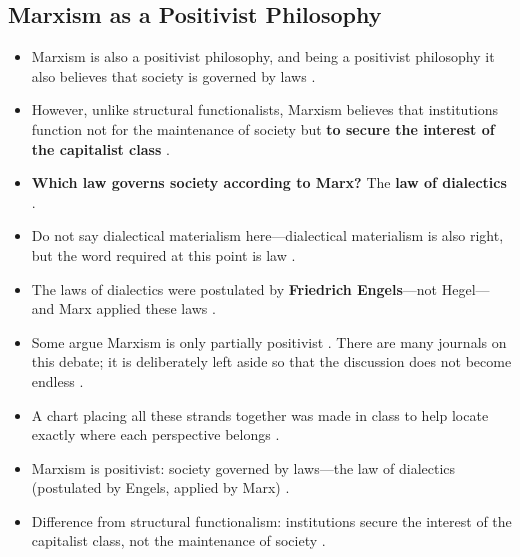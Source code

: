 \subsection{Marxism as a Positivist Philosophy}
\begin{itemize}
    \item Marxism is also a positivist philosophy, and being a positivist philosophy it also believes that society is governed by laws .
    \item However, unlike structural functionalists, Marxism believes that institutions function not for the maintenance of society but \textbf{to secure the interest of the capitalist class} .
    \item \textbf{Which law governs society according to Marx?} The \textbf{law of dialectics} .
\end{itemize}

\begin{CriticalPoint}
\begin{itemize}
    \item Do not say dialectical materialism here---dialectical materialism is also right, but the word required at this point is law .
    \item The laws of dialectics were postulated by \textbf{Friedrich Engels}---not Hegel---and Marx applied these laws .
    \item Some argue Marxism is only partially positivist . There are many journals on this debate; it is deliberately left aside so that the discussion does not become endless .
    \item A chart placing all these strands together was made in class to help locate exactly where each perspective belongs .
\end{itemize}
\end{CriticalPoint}

\begin{QuickRevision}
\begin{itemize}
    \item Marxism is positivist: society governed by laws---the law of dialectics (postulated by Engels, applied by Marx) .
    \item Difference from structural functionalism: institutions secure the interest of the capitalist class, not the maintenance of society .
\end{itemize}
\end{QuickRevision}

